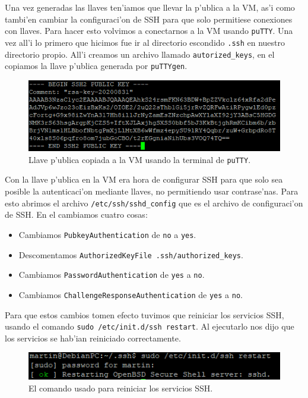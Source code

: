 \documentclass[11pt]{article}
\begin{document}
		Una vez generadas las llaves ten'iamos que llevar la p'ublica a la VM, as'i como tambi'en cambiar la configuraci'on de SSH para que solo permitiese conexiones con llaves. Para hacer esto volvimos a conectarnos a la VM usando \texttt{puTTY}. Una vez all'i lo primero que hicimos fue ir al directorio escondido \texttt{.ssh} en nuestro directorio propio. All'i creamos un archivo llamado \texttt{autorized\_keys}, en el copiamos la llave p'ublica generada por \texttt{puTTYgen}. 
		
		\begin{figure}[H]
    			\centering
    			\includegraphics[scale=0.9]{Images/Connection/public_key.PNG}
    			\caption{Llave p'ublica copiada a la VM usando la terminal de \texttt{puTTY}.}
    			\label{fig:public_key}
		\end{figure}
		
		Con la llave p'ublica en la VM era hora de configurar SSH para que solo sea posible la autenticaci'on mediante llaves, no permitiendo usar contrase'nas. Para esto abrimos el archivo \texttt{/etc/ssh/sshd\_config} que es el archivo de configuraci'on de SSH. En el cambiamos cuatro cosas:
		
		\begin{itemize}
			\item Cambiamos \texttt{PubkeyAuthentication} de \texttt{no} a \texttt{yes}.
			\item Descomentamos \texttt{AuthorizedKeyFile    .ssh/authorized\_keys}.
			\item Cambiamos \texttt{PasswordAuthentication} de \texttt{yes} a  \texttt{no}.
			\item Cambiamos \texttt{ChallengeResponseAuthentication} de \texttt{yes} a \texttt{no}.
		\end{itemize}
		
		Para que estos cambios tomen efecto tuvimos que reiniciar los servicios SSH, usando el comando \texttt{sudo /etc/init.d/ssh restart}. Al ejecutarlo nos dijo que los servicios se hab'ian reiniciado correctamente.
		
		\begin{figure}[H]
    			\centering
    			\includegraphics[scale=0.9]{Images/Connection/ssh_restart.PNG}
    			\caption{El comando usado para reiniciar los servicios SSH.}
    			\label{fig:ssh_restart}
		\end{figure}
		
\end{document}
